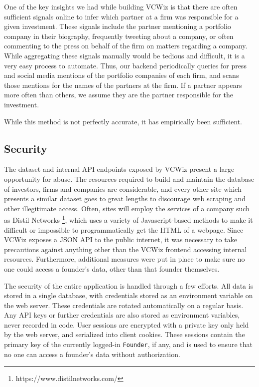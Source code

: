 One of the key insights we had while building VCWiz is that there are often sufficient signals online to infer which partner at a firm was responsible for a given investment. These signals include the partner mentioning a portfolio company in their biography, frequently tweeting about a company, or often commenting to the press on behalf of the firm on matters regarding a company. While aggregating these signals manually would be tedious and difficult, it is a very easy process to automate. Thus, our backend periodically queries for press and social media mentions of the portfolio companies of each firm, and scans those mentions for the names of the partners at the firm. If a partner appears more often than others, we assume they are the partner responsible for the investment.

While this method is not perfectly accurate, it has empirically been sufficient.

\subsection{Security}

The dataset and internal API endpoints exposed by VCWiz present a large opportunity for abuse. The resources required to build and maintain the database of investors, firms and companies are considerable, and every other site which presents a similar dataset goes to great lengths to discourage web scraping and other illegitimate access. Often, sites will employ the services of a company such as Distil Networks \footnote{https://www.distilnetworks.com/}, which uses a variety of Javascript-based methods to make it difficult or impossible to programmatically get the HTML of a webpage. Since VCWiz exposes a JSON API to the public internet, it was necessary to take precautions against anything other than the VCWiz frontend accessing internal resources. Furthermore, additional measures were put in place to make sure no one could access a founder's data, other than that founder themselves.

The security of the entire application is handled through a few efforts. All data is stored in a single database, with credentials stored as an environment variable on the web server. These credentials are rotated automatically on a regular basis. Any API keys or further credentials are also stored as environment variables, never recorded in code. User sessions are encrypted with a private key only held by the web server, and serialized into client cookies. These sessions contain the primary key of the currently logged-in \texttt{Founder}, if any, and is used to ensure that no one can access a founder's data without authorization.

